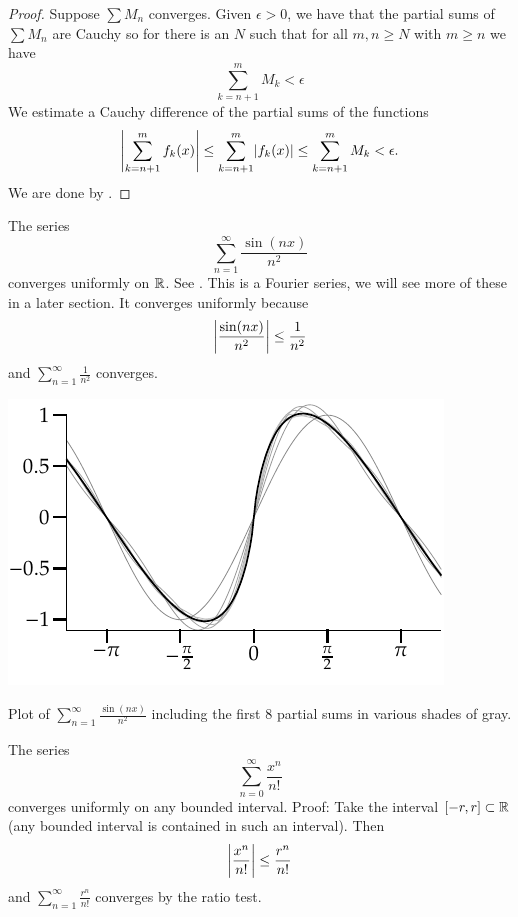 \begin{proof}
Suppose $\sum M_n$ converges.  Given $\epsilon > 0$,
we have that the partial sums of $\sum M_n$ are Cauchy so for
there is an $N$ such that for all $m, n \geq N$ with $m \geq n$ we have
\begin{equation*}
\sum_{k=n+1}^m M_k < \epsilon
\end{equation*}
We estimate a Cauchy difference of the partial
sums of the functions
\begin{equation*}
\left\lvert {\sum_{k=n+1}^m f_k(x)} \right\rvert \leq
\sum_{k=n+1}^m \lvert {f_k(x)} \rvert \leq
\sum_{k=n+1}^m M_k < \epsilon .
\end{equation*}
We are done by .
\end{proof}

\begin{example} \label{example:sinnsqfourier}
The series
\begin{equation*}
\sum_{n=1}^\infty \frac{\sin(nx)}{n^2}
\end{equation*}
converges uniformly on ${\mathbb{R}}$.  See .
This is a Fourier series,
we will see more of these in a later section.  It converges uniformly because
\begin{equation*}
\left\lvert {\frac{\sin(nx)}{n^2}} \right\rvert \leq 
\frac{1}{n^2}
\end{equation*}
and
$\sum_{n=1}^\infty \frac{1}{n^2}$
converges.
\end{example}

\begin{myfigureht}
\includegraphics{figures/fouriersern2}
\caption{Plot of 
$\sum_{n=1}^\infty \frac{\sin(n x)}{n^2}$ including
the first 8 partial sums in various shades of gray.\label{fig:fouriersern2}}
\end{myfigureht}

\begin{example}
The series
\begin{equation*}
\sum_{n=0}^\infty \frac{x^n}{n!} 
\end{equation*}
converges uniformly on any bounded interval.
Proof: Take the interval $[-r,r] \subset {\mathbb{R}}$ (any bounded interval
is contained in such an interval).  Then
\begin{equation*}
\left\lvert {\frac{x^n}{n!} } \right\rvert \leq 
\frac{r^n}{n!}
\end{equation*}
and 
$\sum_{n=1}^\infty \frac{r^n}{n!}$ converges by the ratio test.
\end{example}


